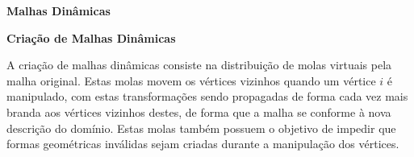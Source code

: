 \begin{frame}{{\bf \color{blue} Malhas Dinâmicas}}
	
	\begin{block}{\bf Criação de Malhas Dinâmicas}
		
		A criação de malhas dinâmicas consiste na distribuição de molas virtuais pela malha original. Estas molas movem os vértices vizinhos quando um vértice $i$ é manipulado, com estas transformações sendo propagadas de forma cada vez mais branda aos vértices vizinhos destes, de forma que a malha se conforme à nova descrição do domínio. Estas molas também possuem o objetivo de impedir que formas geométricas inválidas sejam criadas durante a manipulação dos vértices. 
	\end{block}
	
\end{frame}